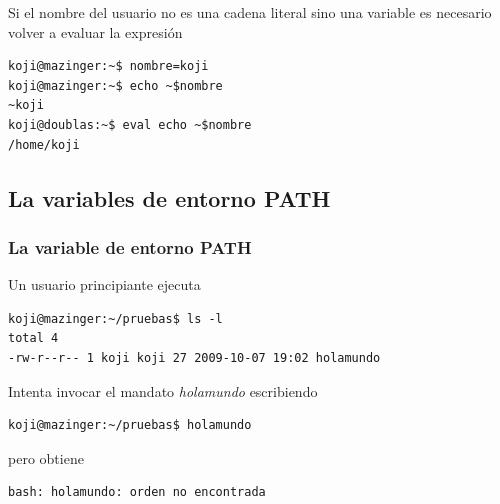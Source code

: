 \documentclass[ucs]{beamer}
\begin{document}
\begin{frame}[fragile]
Si el nombre del usuario no es una cadena literal sino una variable
es necesario volver a evaluar la expresión

  \begin{footnotesize}
  \begin{verbatim}
koji@mazinger:~$ nombre=koji
koji@mazinger:~$ echo ~$nombre
~koji
koji@doublas:~$ eval echo ~$nombre
/home/koji
  \end{verbatim}
  \end{footnotesize}


\end{frame}



\begin{frame}[fragile]
\subsection{La variables de entorno PATH}
\frametitle{La variable de entorno PATH}
Un usuario principiante ejecuta
\begin{footnotesize}
\begin{verbatim}
koji@mazinger:~/pruebas$ ls -l
total 4
-rw-r--r-- 1 koji koji 27 2009-10-07 19:02 holamundo
\end{verbatim}
\end{footnotesize}
Intenta invocar el mandato \emph{holamundo} escribiendo
\begin{footnotesize}
\begin{verbatim}
koji@mazinger:~/pruebas$ holamundo
\end{verbatim}
\end{footnotesize}
pero obtiene
\begin{footnotesize}
\begin{verbatim}
bash: holamundo: orden no encontrada
\end{verbatim}
\end{footnotesize}
\end{frame}
\end{document}
